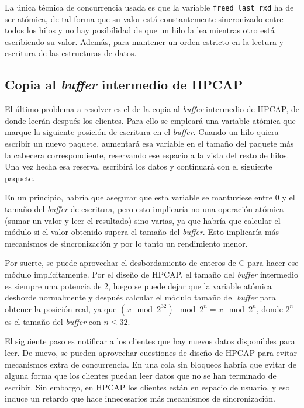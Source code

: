 \documentclass[oneside, draft]{epstfg}
\begin{document}
La única técnica de concurrencia usada es que la variable \texttt{freed\_last\_rxd} ha de ser atómica, de tal forma que su valor está constantemente sincronizado entre todos los hilos y no hay posibilidad de que un hilo la lea mientras otro está escribiendo su valor. Además, para mantener un orden estricto en la lectura y escritura de las estructuras de datos.

\subsection{Copia al \textit{buffer} intermedio de HPCAP}

El último problema a resolver es el de la copia al \textit{buffer} intermedio de HPCAP, de donde leerán después los clientes. Para ello se empleará una variable atómica que marque la siguiente posición de escritura en el \textit{buffer}. Cuando un hilo quiera escribir un nuevo paquete, aumentará esa variable en el tamaño del paquete más la cabecera correspondiente, reservando ese espacio a la vista del resto de hilos. Una vez hecha esa reserva, escribirá los datos y continuará con el siguiente paquete.

En un principio, habría que asegurar que esta variable se mantuviese entre 0 y el tamaño del \textit{buffer} de escritura, pero esto implicaría no una operación atómica (sumar un valor y leer el resultado) sino varias, ya que habría que calcular el módulo si el valor obtenido supera el tamaño del \textit{buffer}. Esto implicaría más mecanismos de sincronización y por lo tanto un rendimiento menor.

Por suerte, se puede aprovechar el desbordamiento de enteros de C para hacer ese módulo implícitamente. Por el diseño de HPCAP, el tamaño del \textit{buffer} intermedio es siempre una potencia de 2, luego se puede dejar que la variable atómica desborde normalmente y después calcular el módulo tamaño del \textit{buffer} para obtener la posición real, ya que $(x \mod 2^{32}) \mod 2^n = x \mod 2^n$, donde $2^n$ es el tamaño del \textit{buffer} con $n ≤ 32$.

El siguiente paso es notificar a los clientes que hay nuevos datos disponibles para leer. De nuevo, se pueden aprovechar cuestiones de diseño de HPCAP para evitar mecanismos extra de concurrencia. En una cola sin bloqueos habría que evitar de alguna forma que los clientes puedan leer datos que no se han terminado de escribir. Sin embargo, en HPCAP los clientes están en espacio de usuario, y eso induce un retardo que hace innecesarios más mecanismos de sincronización.
\end{document}
